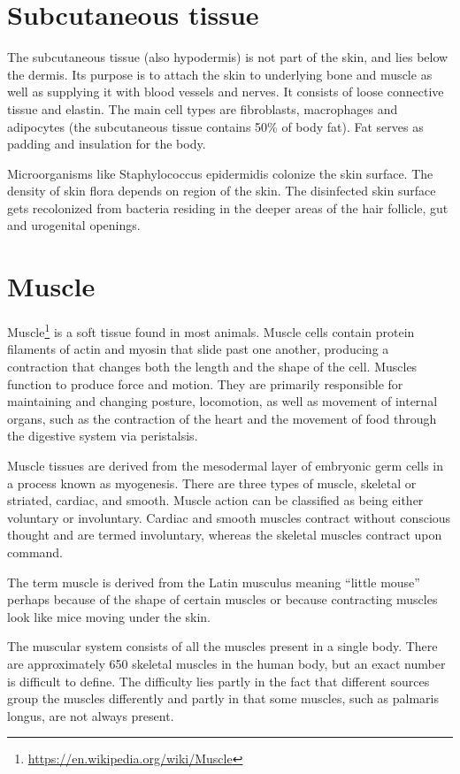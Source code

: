 \documentclass[]{book}
\let\rmarkdownfootnote\footnote%
\def\footnote{\protect\rmarkdownfootnote}
\renewcommand{\href}[2]{#2\footnote{\url{#1}}}
\theoremstyle{definition}
\theoremstyle{definition}
\theoremstyle{definition}
\theoremstyle{remark}
\begin{document}
\section{Subcutaneous tissue}\label{subcutaneous-tissue}

The subcutaneous tissue (also hypodermis) is not part of the skin, and
lies below the dermis. Its purpose is to attach the skin to underlying
bone and muscle as well as supplying it with blood vessels and nerves.
It consists of loose connective tissue and elastin. The main cell types
are fibroblasts, macrophages and adipocytes (the subcutaneous tissue
contains 50\% of body fat). Fat serves as padding and insulation for the
body.

Microorganisms like Staphylococcus epidermidis colonize the skin
surface. The density of skin flora depends on region of the skin. The
disinfected skin surface gets recolonized from bacteria residing in the
deeper areas of the hair follicle, gut and urogenital openings.

\section{Muscle}\label{muscle}

\href{https://en.wikipedia.org/wiki/Muscle}{Muscle} is a soft tissue
found in most animals. Muscle cells contain protein filaments of actin
and myosin that slide past one another, producing a contraction that
changes both the length and the shape of the cell. Muscles function to
produce force and motion. They are primarily responsible for maintaining
and changing posture, locomotion, as well as movement of internal
organs, such as the contraction of the heart and the movement of food
through the digestive system via peristalsis.

Muscle tissues are derived from the mesodermal layer of embryonic germ
cells in a process known as myogenesis. There are three types of muscle,
skeletal or striated, cardiac, and smooth. Muscle action can be
classified as being either voluntary or involuntary. Cardiac and smooth
muscles contract without conscious thought and are termed involuntary,
whereas the skeletal muscles contract upon command.

The term muscle is derived from the Latin musculus meaning ``little
mouse'' perhaps because of the shape of certain muscles or because
contracting muscles look like mice moving under the skin.

The muscular system consists of all the muscles present in a single
body. There are approximately 650 skeletal muscles in the human body,
but an exact number is difficult to define. The difficulty lies partly
in the fact that different sources group the muscles differently and
partly in that some muscles, such as palmaris longus, are not always
present.
\end{document}
